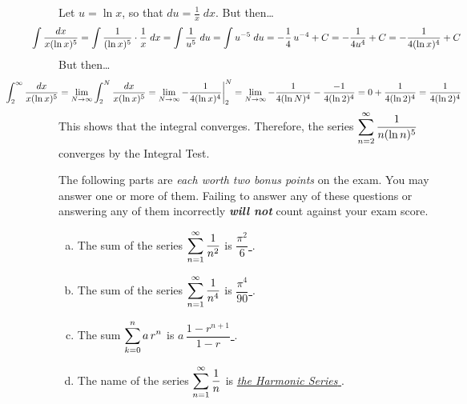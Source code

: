 \documentclass[12pt,letterpaper]{exam}
\begin{document}
\begin{questions}
{Let $u= \ln x$, so that $du= \frac{1}{x} \;dx$. But then\dots
	\[
	\hspace{-1cm} \int \dfrac{dx}{x (\ln x)^5}= \int \dfrac{1}{(\ln x)^5} \cdot \dfrac{1}{x} \;dx= \int \dfrac{1}{u^5} \;du= \int u^{-5} \;du= -\frac{1}{4} \, u^{-4} + C= -\dfrac{1}{4u^4} + C= -\dfrac{1}{4(\ln x)^4} + C
	\]
But then\dots
	\[
	\hspace{-2cm} \int_2^\infty \dfrac{dx}{x (\ln x)^5}= \lim_{N \to \infty} \int_2^N \dfrac{dx}{x (\ln x)^5}= \lim_{N \to \infty} -\dfrac{1}{4(\ln x)^4} \bigg|_2^N= \lim_{N \to \infty} -\dfrac{1}{4(\ln N)^4} - \dfrac{-1}{4 (\ln 2)^4}= 0 + \dfrac{1}{4 (\ln 2)^4}= \dfrac{1}{4 (\ln 2)^4}
	\]
This shows that the integral converges. Therefore, the series $\displaystyle\sum_{n=2}^\infty \dfrac{1}{n (\ln n)^5}$ converges by the Integral Test.}



\newpage
{} The following parts are \textit{each worth two bonus points} on the exam. You may answer one or more of them. Failing to answer any of these questions or answering any of them incorrectly \textit{\bfseries will not} count against your exam score. \par\vspace{0.5cm}
	\begin{enumerate}[(a)]
	\item The sum of the series $\displaystyle\sum_{n=1}^\infty \dfrac{1}{n^2}$ is \underline{\hspace{2cm} $\dfrac{\pi^2}{6}$ \hspace{2cm}}. \par\vspace{0.1cm}
	
	\item The sum of the series $\displaystyle\sum_{n=1}^\infty \dfrac{1}{n^4}$ is \underline{\hspace{2cm} $\dfrac{\pi^4}{90}$ \hspace{2cm}}. \par\vspace{0.1cm}
	
	\item The sum $\displaystyle\sum_{k=0}^n a\, r^n$ is \underline{\hspace{2cm} $a \, \dfrac{1 - r^{n+1}}{1 - r}$ \hspace{2cm}}. \par\vspace{0.1cm}
	
	\item The name of the series $\displaystyle\sum_{n=1}^\infty \dfrac{1}{n}$ is \underline{\hspace{2cm} \itshape the Harmonic Series \hspace{2cm}}. \par\vspace{0.1cm}
	

\end{enumerate}
\end{questions}
\end{document}
